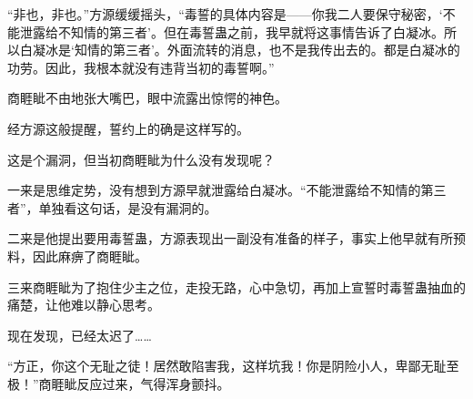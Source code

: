 \begin{this_body}
“非也，非也。”方源缓缓摇头，“毒誓的具体内容是——你我二人要保守秘密，‘不能泄露给不知情的第三者’。但在毒誓蛊之前，我早就将这事情告诉了白凝冰。所以白凝冰是‘知情的第三者’。外面流转的消息，也不是我传出去的。都是白凝冰的功劳。因此，我根本就没有违背当初的毒誓啊。”

商睚眦不由地张大嘴巴，眼中流露出惊愕的神色。

经方源这般提醒，誓约上的确是这样写的。

这是个漏洞，但当初商睚眦为什么没有发现呢？

一来是思维定势，没有想到方源早就泄露给白凝冰。“不能泄露给不知情的第三者”，单独看这句话，是没有漏洞的。

二来是他提出要用毒誓蛊，方源表现出一副没有准备的样子，事实上他早就有所预料，因此麻痹了商睚眦。

三来商睚眦为了抱住少主之位，走投无路，心中急切，再加上宣誓时毒誓蛊抽血的痛楚，让他难以静心思考。

现在发现，已经太迟了……

“方正，你这个无耻之徒！居然敢陷害我，这样坑我！你是阴险小人，卑鄙无耻至极！”商睚眦反应过来，气得浑身颤抖。

\end{this_body}

